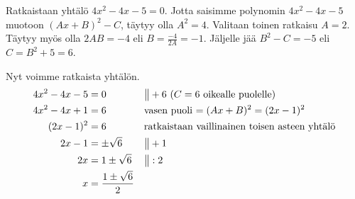 \begin{esimerkki}
Ratkaistaan yhtälö $4x^2-4x-5=0$. Jotta saisimme polynomin $4x^2-4x-5$ muotoon
$(Ax+B)^2-C$, täytyy olla $A^2 = 4$. Valitaan toinen ratkaisu $A = 2$. Täytyy
myös olla $2AB = -4$ eli $B=\frac{-4}{2A}=-1$. Jäljelle jää $B^2 - C = -5$ eli
$C = B^2+5 = 6$.

Nyt voimme ratkaista yhtälön.
\begin{align*}
4x^2-4x-5 &= 0 &&\big\| + 6 \text{ ($C = 6$ oikealle puolelle)} \\
4x^2-4x+1 &= 6 &&\text{vasen puoli $ = (Ax+B)^2 = (2x-1)^2$} \\
(2x-1)^2 &= 6 &&\text{ratkaistaan vaillinainen toisen asteen yhtälö} \\
2x-1 &= \pm \sqrt{6} &&\big\| + 1 \\
2x &= 1 \pm \sqrt{6} &&\big\| : 2 \\
x &= \frac{1\pm \sqrt{6}}{2}
\end{align*}
\end{esimerkki}

% 
% 
% 


